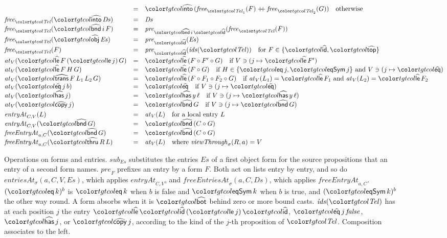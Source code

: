 \begin{figure}
\[\begin{array}{@{}lcl@{}}
& = & \form{into}\,(\mathit{free}_{\tel_1}(F) \mathbin{+\!\!+} \mathit{free}_{\tel_2}(G)) \quad \text{otherwise} \\[3pt]
\mathit{free}_{\tel}(\form{into}\,\mathit{Ds}) & = & \mathit{Ds} \\
\mathit{free}_{\tel}(\form{bnd}\,i\,F) & = & \mathit{pre}_{\form{bnd}\,i\,\form{id}}(\mathit{free}_{\tel}(F)) \\
\mathit{free}_{\tel}(\form{obj}\,\mathit{Es}) & = & \mathit{pre}_{\form{id}}(\mathit{Es}) \\
\mathit{free}_{\tel}(F) & = & \mathit{pre}_{\form{id}}(\mathit{ids}(\tel)) \quad \text{for } F \in \{\form{id}, \form{top}\} \\[3pt]
\mathit{at}_V(\form{le}\,F\,(\ev{le}\,j)\,G) & = & \form{le}\,(F \circ F' \circ G) \quad \text{if } V \ni (j \mapsto \form{le}\,F') \\
\mathit{at}_V(\form{le}\,F\,H\,G) & = & \form{le}\,(F \circ G) \quad \text{if } H \in \{\ev{eq}\,j, \ev{eqSym}\,j\} \text{ and } V \ni (j \mapsto \form{eq}) \\
\mathit{at}_V(\form{trans}\,F\,L_1\,L_2\,G) & = & \form{le}\,(F \circ F_1 \circ F_2 \circ G) \quad \text{if } \mathit{at}_V(L_1) = \form{le}\,F_1 \text{ and } \mathit{at}_V(L_2) = \form{le}\,F_2 \\
\mathit{at}_V(\form{eq}\,j\,b) & = & \form{eq} \quad \text{if } V \ni (j \mapsto \form{eq}) \\
\mathit{at}_V(\form{has}\,j) & = & \form{has}\,y\,\ell \quad \text{if } V \ni (j \mapsto \form{has}\,y\,\ell) \\
\mathit{at}_V(\form{copy}\,j) & = & \form{bnd}\,G \quad \text{if } V \ni (j \mapsto \form{bnd}\,G) \\[3pt]
\mathit{entryAt}_{C,V}(L) & = & \mathit{at}_V(L) \quad \text{for a local entry } L \\
\mathit{entryAt}_{C,V}(\form{bnd}\,G) & = & \form{bnd}\,(C \circ G) \\
\mathit{freeEntryAt}_{a,C}(\form{bnd}\,G) & = & \form{bnd}\,(C \circ G) \\
\mathit{freeEntryAt}_{a,C}(\form{thru}\,R\,L) & = & \mathit{at}_{V}(L) \quad \text{where } \mathit{viewThrough}_\sigma(R, a) = V
\end{array}
\]
\color{black}
\caption{Operations on forms and entries. $\mathit{sub}_{\mathit{Es}}$ substitutes the entries $\mathit{Es}$ of a first object form for the source propositions that an entry of a second form names. $\mathit{pre}_F$ prefixes an entry by a form $F$. Both act on lists entry by entry, and so do $\mathit{entriesAt}_\sigma(a, C, V, \mathit{Es})$, which applies $\mathit{entryAt}_{C,V}$, and $\mathit{freeEntriesAt}_\sigma(a, C, \mathit{Ds})$, which applies $\mathit{freeEntryAt}_{a,C}$. $(\ev{eq}\,k)^b$ is $\ev{eq}\,k$ when $b$ is false and $\ev{eqSym}\,k$ when $b$ is true, and $(\ev{eqSym}\,k)^b$ the other way round. A form absorbs when it is $\form{bot}$ behind zero or more bound casts. $\mathit{ids}(\tel)$ has at each position $j$ the entry $\form{le}\,\form{id}\,(\ev{le}\,j)\,\form{id}$, $\form{eq}\,j\,\mathit{false}$, $\form{has}\,j$, or $\form{copy}\,j$, according to the kind of the $j$-th proposition of $\tel$. Composition associates to the left.}

\end{figure}
